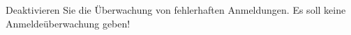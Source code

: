 \item Deaktivieren Sie die Überwachung von fehlerhaften Anmeldungen. Es
soll keine Anmeldeüberwachung geben!
